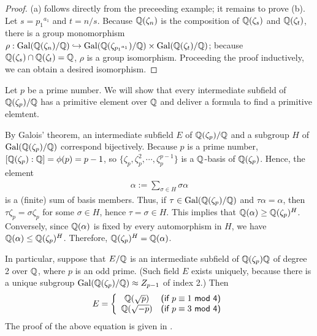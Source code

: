 \begin{proof}
    (a) follows directly from the preceeding example; it remains to prove (b).
    Let $s={p_1}^{a_1}$ and $t=n/s$.
    Because ${\mathbb{Q}}(\zeta_n)$ is the composition of ${\mathbb{Q}}(\zeta_s)$ and ${\mathbb{Q}}(\zeta_t)$, there is a group monomorphism $\rho: {\textrm{Gal}({{\mathbb{Q}}(\zeta_n)/{\mathbb{Q}}})}\hookrightarrow{\textrm{Gal}({{\mathbb{Q}}(\zeta_{{p_1}^{a_1}})/{\mathbb{Q}}})}\times{\textrm{Gal}({{\mathbb{Q}}(\zeta_t)/{\mathbb{Q}}})}$; because ${\mathbb{Q}}(\zeta_s)\cap{\mathbb{Q}}(\zeta_t)={\mathbb{Q}}$, $\rho$ is a group isomorphism.
    Proceeding the proof inductively, we can obtain a desired isomorphism.
\end{proof}

\begin{obs}
    Let $p$ be a prime number.
    We will show that every intermediate subfield of ${\mathbb{Q}}(\zeta_p)/{\mathbb{Q}}$ has a primitive element over ${\mathbb{Q}}$ and deliver a formula to find a primitive elemtent.

    By Galois' theorem, an intermediate subfield $E$ of ${\mathbb{Q}}(\zeta_p)/{\mathbb{Q}}$ and a subgroup $H$ of ${\textrm{Gal}({{\mathbb{Q}}(\zeta_p)/{\mathbb{Q}}})}$ correspond bijectively.
    Because $p$ is a prime number, $[{\mathbb{Q}}(\zeta_p):{\mathbb{Q}}]=\phi(p)=p-1$, so $\{\zeta_p, \zeta_p^2, \cdots, \zeta_p^{p-1}\}$ is a ${\mathbb{Q}}$-basis of ${\mathbb{Q}}(\zeta_p)$.
    Hence, the element
    \begin{align*}
        \alpha:=\sum_{\sigma\in H}\sigma\alpha
    \end{align*}
    is a (finite) sum of basis members.
    Thus, if $\tau\in{\textrm{Gal}({{\mathbb{Q}}(\zeta_p)/{\mathbb{Q}}})}$ and $\tau\alpha=\alpha$, then $\tau\zeta
    _p=\sigma\zeta_p$ for some $\sigma\in H$, hence $\tau=\sigma\in H$.
    This implies that ${\mathbb{Q}}(\alpha)\geq{\mathbb{Q}}(\zeta_p)^H$.
    Conversely, since ${\mathbb{Q}}(\alpha)$ is fixed by every automorphism in $H$, we have ${\mathbb{Q}}(\alpha)\leq{\mathbb{Q}}(\zeta_p)^H$.
    Therefore, ${\mathbb{Q}}(\zeta_p)^H={\mathbb{Q}}(\alpha)$.
    
    In particular, suppose that $E/{\mathbb{Q}}$ is an intermediate subfield of ${\mathbb{Q}}(\zeta_p){\mathbb{Q}}$ of degree 2 over ${\mathbb{Q}}$, where $p$ is an odd prime.
    (Such field $E$ exists uniquely, because there is a unique subgroup ${\textrm{Gal}({{\mathbb{Q}}(\zeta_p)/{\mathbb{Q}}})}\approx Z_{p-1}$ of index 2.)
    Then
    \begin{align}\label{quadratic_cyclotomic_extension_over_Q}
        E=\left\{\begin{array}{cc}
            {\mathbb{Q}}(\sqrt{p})    &  \textsf{(if $p\equiv 1$ mod 4)}\\
            {\mathbb{Q}}(\sqrt{-p})    &  \textsf{(if $p\equiv 3$ mod 4)}
        \end{array}\right.
    \end{align}
    The proof of the above equation is given in .
\end{obs}

